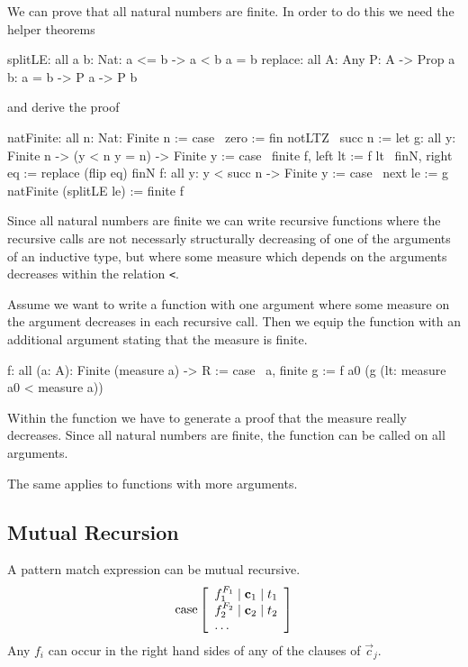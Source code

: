 We can prove that all natural numbers are finite. In order to do this we need
the helper theorems
%
\begin{alba}
    splitLE: all {a b: Nat}: a <= b  ->  a < b \/ a = b
    replace: all {A: Any} {P: A -> Prop} {a b}: a = b -> P a -> P b
\end{alba}
%
and derive the proof
%
\begin{alba}
    natFinite: all {n: Nat}: Finite n := case
        \ {zero}   := fin notLTZ
        \ {succ n} :=
            let
                g: all {y}: Finite n -> (y < n \/ y = n) -> Finite y := case
                    \ finite f, left  lt   := f lt
                    \ finN,     right eq   := replace (flip eq) finN
                f: all {y}: y < succ n -> Finite y := case
                    \ next le :=
                        g natFinite (splitLE le)
            :=
                finite f
\end{alba}

Since all natural numbers are finite we can write recursive functions where the
recursive calls are not necessarly structurally decreasing of one of the
arguments of an inductive type, but where some measure which depends on the
arguments decreases within the relation \lstinline!<!.

Assume we want to write a function with one argument where some measure on the
argument decreases in each recursive call. Then we equip the function with an
additional argument stating that the measure is finite.
%
\begin{alba}
    f: all (a: A): Finite (measure a) -> R := case
        \ a, finite g :=
            f a0 (g (lt: measure a0 < measure a))
\end{alba}
%
Within the function we have to generate a proof that the measure really
decreases. Since all natural numbers are finite, the function can be called on
all arguments.

The same applies to functions with more arguments.




\subsection{Mutual Recursion}

A pattern match expression can be mutual recursive.
$$
    {\text{case}} \left[ \begin{array}{lllll} 
        f_1^{F_1} \mid {\mathbf c}_1 \mid t_1
        \\
        f_2^{F_2} \mid {\mathbf c}_2 \mid t_2
        \\
        \ldots
     \end{array} \right]
$$
Any $f_i$ can occur in the right hand sides of any of the clauses of $\vec c_j$.

